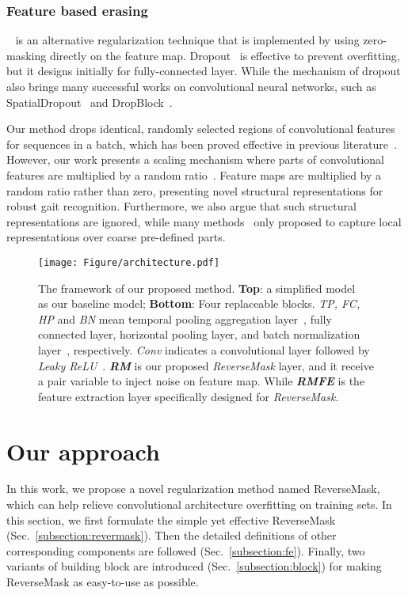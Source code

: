 \documentclass[runningheads]{llncs}
\begin{document}
    
    \subsubsection{Feature based erasing}~\cite{batchdropblock,ghiasi2018dropblock} is an alternative regularization technique that is implemented by using zero-masking directly on the feature map. Dropout~\cite{dropout} is effective to prevent overfitting, but it designs initially for fully-connected layer. While the mechanism of dropout also brings many successful works on convolutional neural networks, such as SpatialDropout~\cite{spatialdropout} and DropBlock~\cite{ghiasi2018dropblock}.

    Our method drops identical, randomly selected regions of convolutional features for sequences in a batch, which has been proved effective in previous literature~\cite{batchdropblock}. However, our work presents a scaling mechanism where parts of convolutional features are multiplied by a random ratio~\cite{beyonddropout}. Feature maps are multiplied by a random ratio rather than zero, presenting novel structural representations for robust gait recognition. Furthermore, we also argue that such structural representations are ignored, while many methods~\cite{gaitpart,gaitmask} only proposed to capture local representations over coarse pre-defined parts\cite{gaitgl,gaitmaskold}.



\begin{figure}[ht]
\centering
\texttt{[image: Figure/architecture.pdf]}
\centering
\caption{
The framework of our proposed method. \textbf{Top}: a simplified model~\cite{gaitgl} as our baseline model; \textbf{Bottom}: Four replaceable blocks. \textit{TP, FC, HP} and \textit{BN} mean temporal pooling aggregation layer~\cite{gaitgl,aaai2019gaitset}, fully connected layer, horizontal pooling layer\cite{HPP}, and batch normalization layer~\cite{batchnorm}, respectively. \textit{Conv} indicates a convolutional layer followed by \textit{Leaky ReLU}~\cite{leakyrelu}. \textit{\textbf{RM}} is our proposed \textit{ReverseMask} layer, and it receive a pair variable to inject noise on feature map. While \textbf{\textit{RMFE}} is the feature extraction layer specifically designed for \textit{ReverseMask}.
}
\label{fig:ratio}
\vspace{-5mm}
\end{figure}


\section{Our approach}
In this work, we propose a novel regularization method named ReverseMask, which can help relieve convolutional architecture overfitting on training sets. In this section, we first formulate the simple yet effective ReverseMask (Sec.~\ref{subsection:revermask}). Then the detailed definitions of other corresponding components are followed (Sec.~\ref{subsection:fe}). Finally, two variants of building block are introduced (Sec.~\ref{subsection:block}) for making ReverseMask as easy-to-use as possible.
\end{document}
